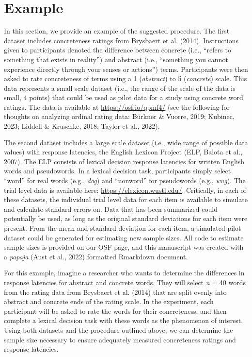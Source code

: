 \documentclass[
  man]{apa7}
\begin{document}
\section{Example}\label{example}

In this section, we provide an example of the suggested procedure. The first dataset includes concreteness ratings from Brysbaert et al. (2014). Instructions given to participants denoted the difference between concrete (i.e., ``refers to something that exists in reality'') and abstract (i.e., ``something you cannot experience directly through your senses or actions'') terms. Participants were then asked to rate concreteness of terms using a 1 (\emph{abstract}) to 5 (\emph{concrete}) scale. This data represents a small scale dataset (i.e., the range of the scale of the data is small, 4 points) that could be used as pilot data for a study using concrete word ratings. The data is available at \url{https://osf.io/qpmf4/} (see the following for thoughts on analyzing ordinal rating data: Bürkner \& Vuorre, 2019; Kubinec, 2023; Liddell \& Kruschke, 2018; Taylor et al., 2022).

The second dataset includes a large scale dataset (i.e., wide range of possible data values) with response latencies, the English Lexicon Project (ELP, Balota et al., 2007). The ELP consists of lexical decision response latencies for written English words and pseudowords. In a lexical decision task, participants simply select ``word'' for real words (e.g., \emph{dog}) and ``nonword'' for pseudowords (e.g., \emph{wug}). The trial level data is available here: \url{https://elexicon.wustl.edu/}. Critically, in each of these datasets, the individual trial level data for each item is available to simulate and calculate standard errors on. Data that has been summarized could potentially be used, as long as the original standard deviations for each item were present. From the mean and standard deviation for each item, a simulated pilot dataset could be generated for estimating new sample sizes. All code to estimate sample sizes is provided on our OSF page, and this manuscript was created with a \emph{papaja} (Aust et al., 2022) formatted Rmarkdown document.

For this example, imagine a researcher who wants to determine the differences in response latencies for abstract and concrete words. They will select \emph{n} = 40 words from the rating data from Brysbaert et al. (2014) that are split evenly into abstract and concrete ends of the rating scale. In the experiment, each participant will be asked to rate the words for their concreteness, and then complete a lexical decision task with these words as the phenomenon of interest. Using both datasets and the procedure outlined above, we can determine the sample size necessary to ensure adequately measured concreteness ratings and response latencies.
\end{document}
